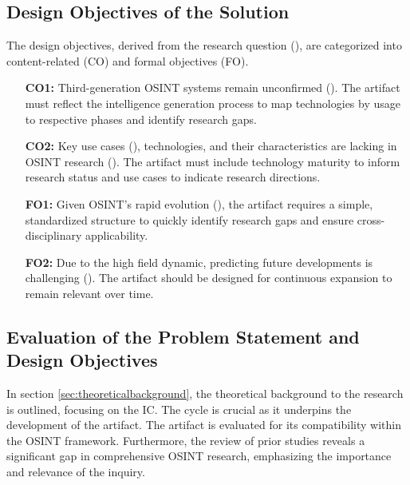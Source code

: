 \documentclass[10pt]{article}
\begin{document}
\subsection{Design Objectives of the Solution} \label{sec:designobjectives}


The design objectives, derived from the research question (\cite{Peffers.2007}), are categorized into content-related (CO) and formal objectives (FO).

\begin{itemize}
    \item[\textbf{CO1:}] Third-generation OSINT systems remain unconfirmed (\cite{Ghioni.2023}). The artifact must reflect the intelligence generation process to map technologies by usage to respective phases and identify research gaps.
    \item[\textbf{CO2:}] Key use cases (\cite{AlKilani.2021, Dokman.2020, Ghioni.2023}), technologies, and their characteristics are lacking in OSINT research (\cite{Ish.2022}). The artifact must include technology maturity to inform research status and use cases to indicate research directions.
    \item[\textbf{FO1:}] Given OSINT's rapid evolution (\cite{Ghioni.2023}), the artifact requires a simple, standardized structure to quickly identify research gaps and ensure cross-disciplinary applicability.
    \item[\textbf{FO2:}] Due to the high field dynamic, predicting future developments is challenging (\cite{Benes.2013}). The artifact should be designed for continuous expansion to remain relevant over time.
\end{itemize}

\subsection{Evaluation of the Problem Statement and Design Objectives} \label{sec:eval}
In section \ref{sec:theoreticalbackground}, the theoretical background to the research is outlined, focusing on the IC. The cycle is crucial as it underpins the development of the artifact. The artifact is evaluated for its compatibility within the OSINT framework. Furthermore, the review of prior studies reveals a significant gap in comprehensive OSINT research, emphasizing the importance and relevance of the inquiry.
\end{document}
